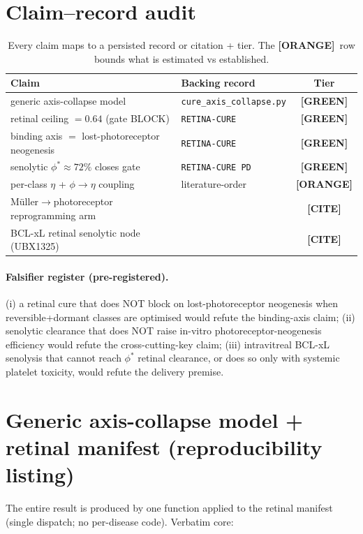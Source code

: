\documentclass[11pt,a4paper]{article}
\newcommand{\tierbadge}[2]{\textcolor{#1}{\textbf{[#2]}}}
\providecommand{\tierGreen}{\tierbadge{green!45!black}{GREEN}}
\providecommand{\tierYellow}{\tierbadge{yellow!50!black}{CITE}}
\providecommand{\tierOrange}{\tierbadge{orange!80!black}{ORANGE}}
\begin{document}
\appendix
\section{Claim--record audit}
\label{app:audit}
\begin{table}[h]\centering\small
\begin{tabular}{@{}>{\raggedright\arraybackslash}m{7.2cm} >{\raggedright\arraybackslash}m{3.8cm} c@{}}
\toprule
\textbf{Claim} & \textbf{Backing record} & \textbf{Tier} \\
\midrule
generic axis-collapse model & \texttt{cure\_axis\_collapse.py} & \tierGreen \\
retinal ceiling $=0.64$ (gate BLOCK) & \texttt{RETINA-CURE} & \tierGreen \\
binding axis $=$ lost-photoreceptor neogenesis & \texttt{RETINA-CURE} & \tierGreen \\
senolytic $\phi^\ast\!\approx\!72\%$ closes gate & \texttt{RETINA-CURE PD} & \tierGreen \\
per-class $\eta$ + $\phi\!\to\!\eta$ coupling & literature-order & \tierOrange \\
M\"uller$\to$photoreceptor reprogramming arm & \citep{jorstad2017,yao2018} & \tierYellow \\
BCL-xL retinal senolytic node (UBX1325) & \citep{crespodawid2024} & \tierYellow \\
\bottomrule
\end{tabular}
\caption{Every claim maps to a persisted record or citation + tier. The \tierOrange\ row bounds
what is estimated vs established.}
\label{tab:audit}
\end{table}

\paragraph{Falsifier register (pre-registered).} (i) a retinal cure that does NOT block on
lost-photoreceptor neogenesis when reversible+dormant classes are optimised would refute the
binding-axis claim; (ii) senolytic clearance that does NOT raise in-vitro photoreceptor-neogenesis
efficiency would refute the cross-cutting-key claim; (iii) intravitreal BCL-xL senolysis that
cannot reach $\phi^\ast$ retinal clearance, or does so only with systemic platelet toxicity, would
refute the delivery premise.

\section{Generic axis-collapse model + retinal manifest (reproducibility listing)}
\label{app:code}
The entire result is produced by one function applied to the retinal manifest (single dispatch;
no per-disease code). Verbatim core:
\end{document}
